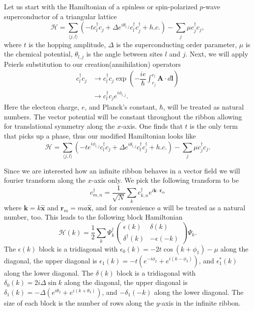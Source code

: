 \documentclass[aps,prb,showpacs,amsmath,amssymb,superscriptaddress]{revtex4-2}
\let\oldhat\hat
\renewcommand{\hat}[1]{\oldhat{\mathbf{#1}}}
\renewcommand{\vec}[1]{\mathbf{#1}}
\newcommand{\Ham}{\mathcal{H}}
\newcommand{\cc}{c^{\dagger}}
\newcommand{\de}{\Delta}
\begin{document}
Let us start with the Hamiltonian of a spinless or spin-polarized $p$-wave superconductor of a triangular lattice
\begin{equation}
  \Ham = \sum_{\langle j, l \rangle} (-t\cc_{l} c_j + \de e^{i\theta_{l,j}} \cc_{l}\cc_j + h.c.) - \sum_{j} \mu \cc_j c_j,
\end{equation}
where $t$ is the hopping amplitude, $\de$ is the superconducting order parameter, $\mu$ is the chemical potential, $\theta_{l,j}$ is the angle between sites $l$ and $j$.
Next, we will apply Peierls substitution to our creation(annihilation) operators
\begin{align}
  \cc_{l} c_j &\rightarrow \cc_{l} c_j \exp \left(-\dfrac{i e}{\hbar} \int_{r_j}^{r_{l}} \vec{A} \cdot d\vec{l} \right) \\ \nonumber
  &\rightarrow \cc_{l} c_j e^{i \phi_{l,j}}.
\end{align}
Here the electron charge, $e$, and Planck's constant, $\hbar$, will be treated as natural numbers.
The vector potential will be constant throughout the ribbon allowing for translational symmetry along the $x$-axis.
One finds that $t$ is the only term that picks up a phase, thus our modified Hamiltonian looks like
\begin{equation} \label{eq: Peierls chain}
  \Ham = \sum_{\langle j,l \rangle} (-t e^{i\phi_{l,j}} \cc_{l} c_j + \de e^{i\theta_{l,j}} \cc_{l}\cc_j + h.c.) - \sum_j \mu \cc_j c_j.
\end{equation}

Since we are interested how an infinite ribbon behaves in a vector field we will fourier transform along the $x$-axis only.
We pick the following transform to be
\begin{equation}
  \cc_{m,n} = \dfrac{1}{\sqrt{N}} \sum_{k} \cc_{k,n} e^{i \vec{k}\cdot\vec{r}_m}
\end{equation}
where $\vec{k}=k\hat{x}$ and $\vec{r}_m = ma\hat{x}$, and for convenience $a$ will be treated as a natural number, too.
This leads to the following block Hamiltonian
\begin{equation}
  \Ham(k) = \dfrac{1}{2} \sum_k \Psi_k^\dagger \left(
    \begin{matrix}
      \epsilon(k) & \delta(k) \\
      \delta^\dagger(k) & -\epsilon(-k)
    \end{matrix} \right)
    \Psi_k.
\end{equation}
The $\epsilon(k)$ block is a tridiagonal with $\epsilon_0(k) = -2t\cos(k+\phi_1) - \mu$ along the diagonal, the upper diagonal is  $\epsilon_1(k) = -t(e^{-i\phi_2}+e^{i(k-\phi_3)})$, and $\epsilon_1^*(k)$ along the lower diagonal.
The $\delta(k)$ block is a tridiagonal with $\delta_0(k) = 2i\de \sin k $ along the diagonal, the upper diagonal is  $\delta_1(k) = -\de (e^{i\theta_2}+e^{i(k+\theta_3)})$, and $-\delta_1(-k)$ along the lower diagonal.
The size of each block is the number of rows along the $y$-axis in the infinite ribbon.
\end{document}
